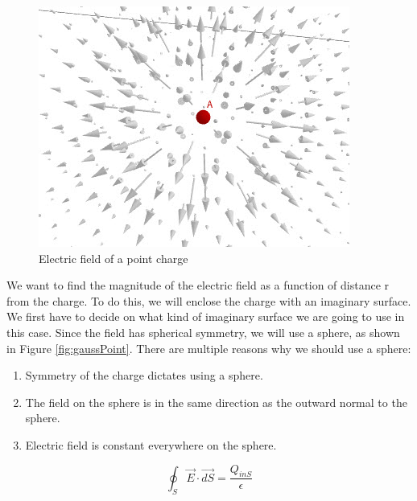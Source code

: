 \documentclass{ximera}
\begin{document}
\begin{figure}[h!]
\begin{center}
\includegraphics[scale=1]{../jpg/pointChargeField.jpg}
\end{center}
\caption{Electric field of a point charge}
\label{fig:eField}
\end{figure}




We want to find the magnitude of the electric field as a function of distance r from the charge. To do this, we will enclose the charge with an imaginary surface. We first have to decide on what kind of imaginary surface we are going to use in this case. Since the field has spherical symmetry, we will use a sphere, as shown in Figure \ref{fig:gaussPoint}. There are multiple reasons why we should use a sphere:

\begin{enumerate}
\item Symmetry of the charge dictates using a sphere.
\item The field on the sphere is in the same direction as the outward normal to the sphere.
\item Electric field is constant everywhere on the sphere.
\end{enumerate}




\begin{equation}
\oint_S \vec{E} \cdot \vec{dS} = \frac{Q_{inS}}{\epsilon}
\end{equation}
\end{document}

